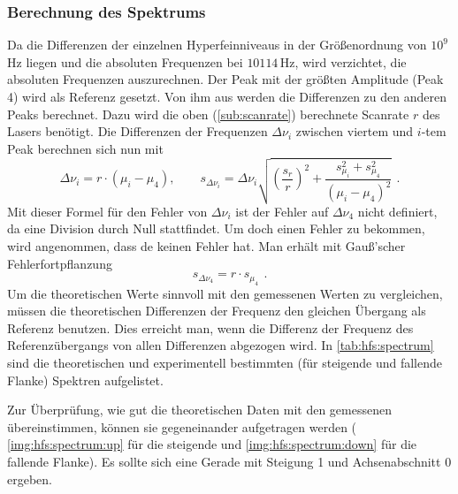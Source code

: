 \subsubsection*{Berechnung des Spektrums}
Da die Differenzen der einzelnen Hyperfeinniveaus in der Größenordnung von $10^9$\,Hz liegen und die absoluten Frequenzen bei $101 {14}$\,Hz, 
wird verzichtet, die absoluten Frequenzen auszurechnen. Der Peak mit der größten Amplitude (Peak 4) wird als Referenz gesetzt. Von ihm aus werden 
die Differenzen zu den anderen Peaks berechnet. Dazu wird die oben (\autoref{sub:scanrate}) berechnete Scanrate $r$ des Lasers benötigt.
Die Differenzen der Frequenzen $\Delta \nu_i$ zwischen viertem und $i$-tem Peak berechnen sich nun mit
\begin{equation}
    \Delta \nu_i = r \cdot \left( \mu_i - \mu_4 \right), 
    \qquad s_{\Delta \nu_i} = \Delta \nu_i \sqrt{ \left( \frac{s_r}{r} \right)^2 + \frac{s_{\mu_i}^2 + s_{\mu_4}^2}{ \left( \mu_i - \mu_4 \right)^2 }} \ \, .
\end{equation}
Mit dieser Formel für den Fehler von $\Delta \nu_i$ ist der Fehler auf $\Delta \nu_4$ nicht definiert, da eine Division durch Null stattfindet.
Um doch einen Fehler zu bekommen, wird angenommen, dass de keinen Fehler hat. Man erhält mit Gauß'scher Fehlerfortpflanzung
\begin{equation}
    s_{\Delta \nu_4} = r \cdot s_{\mu_4} \ \, .
\end{equation}
Um die theoretischen Werte sinnvoll mit den gemessenen Werten zu vergleichen, müssen die theoretischen Differenzen der Frequenz den gleichen 
Übergang als Referenz benutzen. Dies erreicht man, wenn die Differenz der Frequenz des Referenzübergangs von allen Differenzen abgezogen wird.
In \autoref{tab:hfs:spectrum} sind die theoretischen und experimentell bestimmten (für steigende und fallende Flanke) Spektren aufgelistet.   

Zur Überprüfung, wie gut die theoretischen Daten mit den gemessenen übereinstimmen, können sie gegeneinander aufgetragen werden 
( \autoref{img:hfs:spectrum:up} für die steigende und \autoref{img:hfs:spectrum:down} für die fallende Flanke). Es sollte sich 
eine Gerade mit Steigung 1 und Achsenabschnitt 0 ergeben.

